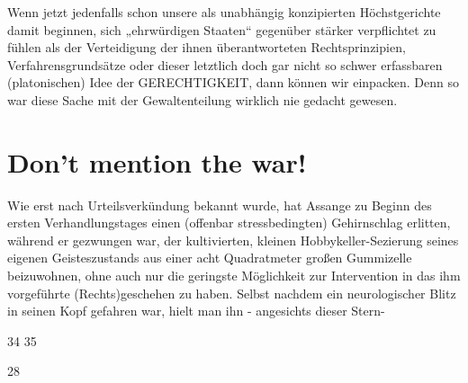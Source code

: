 \begin{multicols}{2}
Wenn jetzt jedenfalls schon unsere als unabhängig konzipierten Höchstgerichte damit beginnen, sich „ehrwürdigen Staaten“ gegenüber stärker verpflichtet zu fühlen
als der Verteidigung der ihnen überantworteten Rechtsprinzipien, Verfahrensgrundsätze oder dieser letztlich
doch gar nicht so schwer erfassbaren (platonischen)
Idee der GERECHTIGKEIT, dann können wir einpacken.
Denn so war diese Sache mit der Gewaltenteilung wirklich nie gedacht gewesen.

\section{Don’t mention the war!} %
Wie erst nach Urteilsverkündung bekannt wurde, hat Assange zu Beginn des ersten Verhandlungstages einen (offenbar stressbedingten) Gehirnschlag erlitten, während
er gezwungen war, der kultivierten, kleinen Hobbykeller-Sezierung seines eigenen Geisteszustands aus einer
acht Quadratmeter großen Gummizelle beizuwohnen,
ohne auch nur die geringste Möglichkeit zur Intervention in das ihm vorgeführte (Rechts)geschehen zu haben.
Selbst nachdem ein neurologischer Blitz in seinen Kopf
gefahren war, hielt man ihn - angesichts dieser Stern-

34
35

28


\end{multicols}
